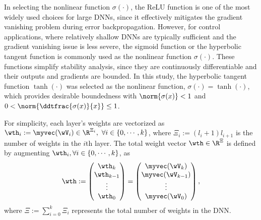 \documentclass[letterpaper, journal]{IEEEtran}
\begin{document}
    In selecting the nonlinear function $\sigma(\cdot)$, the ReLU function \cite{Maas:2013aa} is one of the most widely used choices for large DNNs, since it effectively mitigates the gradient vanishing problem during error backpropagation. 
    However, for control applications, where relatively shallow DNNs are typically sufficient and the gradient vanishing issue is less severe, the sigmoid function or the hyperbolic tangent function is commonly used as the nonlinear function $\sigma(\cdot)$. 
    These functions simplify stability analysis, since they are continuously differentiable and their outputs and gradients are bounded. 
In this study, the hyperbolic tangent function $\tanh(\cdot)$ was selected as the nonlinear function, \ie $\sigma(\cdot) = \tanh(\cdot)$, which provides desirable boundedness with $\norm{\sigma(x)}<1$ and $0<\norm{\ddtfrac{\sigma(x)}{x}}\le 1$.

For simplicity, each layer's weights are vectorized as $\wth_i:=\myvec(\wV_i)\in\R^{\Xi_i},\ \forall i\in\{0,\cdots,k\}$, where $\Xi_i:= (l_i+1)l_{i+1}$ is the number of weights in the $i$th layer. 
The total weight vector $\wth\in\R^{\Xi}$ is defined by augmenting $\wth_i, \forall i\in \{0,\cdots,k\}$, as 
\begin{equation}
    \wth := 
    \begin{pmatrix}
        \wth_k\\
        \wth_{k-1}\\
        \vdots\\
        \wth_0
    \end{pmatrix}
    =
    \begin{pmatrix}
        \myvec(\wV_k)\\
        \myvec(\wV_{k-1})\\
        \vdots\\
        \myvec(\wV_0)
    \end{pmatrix},
\end{equation}
where $\Xi:={\sum_{i=0}^{k} \Xi_i}$ represents the total number of weights in the DNN.
\end{document}
